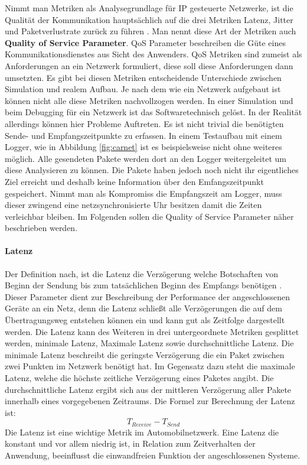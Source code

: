 \documentclass[draft=false
              ,paper=a4
              ,twoside=false
              ,fontsize=11pt
              ,headsepline
              ,BCOR10mm
              ,DIV11
              ]{scrbook}
\begin{document}
Nimmt man Metriken als Analysegrundlage für IP gesteuerte Netzwerke, ist die Qualität der Kommunikation hauptsächlich auf die drei Metriken Latenz, Jitter und Paketverlustrate zurück zu führen \cite{kempf_simulationsbasierte_2014} \cite{steinbach_metrik_2011}. Man nennt diese Art der Metriken auch \textbf{Quality of Service Parameter}. QoS Parameter beschreiben die Güte eines Kommunikationsdienstes aus Sicht des Anwenders. QoS Metriken sind zumeist als Anforderungen an ein Netzwerk formuliert, diese soll diese Anforderungen dann umsetzten. Es gibt bei diesen Metriken entscheidende Unterschiede zwischen Simulation und realem Aufbau. Je nach dem wie ein Netzwerk aufgebaut ist können nicht alle diese Metriken nachvollzogen werden. In einer Simulation und beim Debugging für ein Netzwerk ist das Softwaretechnisch gelöst. In der Realität allerdings können hier Probleme Auftreten. Es ist nicht trivial die benötigten Sende- und Empfangszeitpunkte zu erfassen. In einem Testaufbau mit einem Logger, wie in Abbildung \ref{fig:carnet} ist es beispielsweise nicht ohne weiteres möglich. Alle gesendeten Pakete werden dort an den Logger weitergeleitet um diese Analysieren zu können. Die Pakete haben jedoch noch nicht ihr eigentliches Ziel erreicht und deshalb keine Information über den Emfangszeitpunkt gespeichert. Nimmt man als Kompromiss die Empfangszeit am Logger, muss dieser zwingend eine netzsynchronisierte Uhr besitzen damit die Zeiten verleichbar bleiben. Im Folgenden sollen die Quality of Service Parameter näher beschrieben werden. 

\paragraph{Latenz} %
\label{par:Latenz}
Der Definition nach, ist die Latenz die Verzögerung welche Botschaften von Beginn der Sendung bis zum tatsächlichen Beginn des Empfangs benötigen \cite{reif_automobilelektronik:_2009}. Dieser Parameter dient zur Beschreibung der Performance der angeschlossenen Geräte an ein Netz, denn die Latenz schließt alle Verzögerungen die auf dem Übertragungsweg entstehen können ein und kann gut als Zeitfolge dargestellt werden. Die Latenz kann des Weiteren in drei untergeordnete Metriken gesplittet werden, minimale Latenz, Maximale Latenz sowie durchschnittliche Latenz. Die minimale Latenz beschreibt die geringste Verzögerung die ein Paket zwischen zwei Punkten im Netzwerk benötigt hat. Im Gegensatz dazu steht die maximale Latenz, welche die höchste zeitliche Verzögerung eines Paketes angibt. Die durchschnittliche Latenz ergibt sich aus der mittleren Verzögerung aller Pakete innerhalb eines vorgegebenen Zeitraums.
Die Formel zur Berechnung der Latenz ist:
\begin{equation}
  T_{Receive} - T_{Send}
\end{equation}
 Die Latenz ist eine wichtige Metrik im Automobilnetzwerk. Eine Latenz die konstant und vor allem niedrig ist, in Relation zum Zeitverhalten der Anwendung, beeinflusst die einwandfreien Funktion der angeschlossenen Systeme. 
\end{document}
